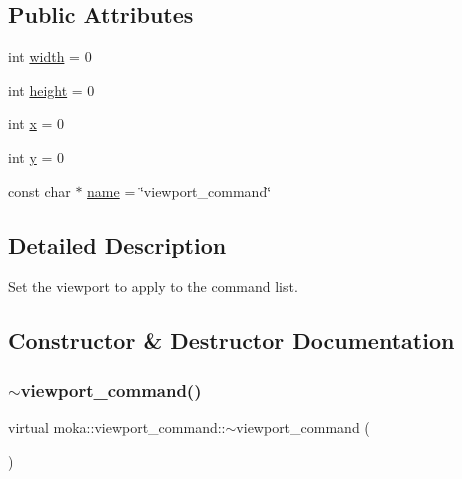 \subsection*{Public Attributes}
\begin{DoxyCompactItemize}
\item 
int \mbox{\hyperlink{classmoka_1_1viewport__command_a784e567b923e2fccf12dddc4739bb931}{width}} = 0
\item 
int \mbox{\hyperlink{classmoka_1_1viewport__command_ab64f17e585f3dbab2e45959cde1c429e}{height}} = 0
\item 
int \mbox{\hyperlink{classmoka_1_1viewport__command_a969e11499ed8e5bf1a389ec4c6bd7a4f}{x}} = 0
\item 
int \mbox{\hyperlink{classmoka_1_1viewport__command_a7141660e90f1abb2f3ce40c9d42d91f2}{y}} = 0
\item 
const char $\ast$ \mbox{\hyperlink{classmoka_1_1viewport__command_a36c3611773b0da39c29d1682e3a22944}{name}} = \char`\"{}viewport\+\_\+command\char`\"{}
\end{DoxyCompactItemize}


\subsection{Detailed Description}
Set the viewport to apply to the command list. 

\subsection{Constructor \& Destructor Documentation}
\mbox{\label{classmoka_1_1viewport__command_aed04702ad92d74fbf111babf9d68076d}} 
\subsubsection{\texorpdfstring{$\sim$viewport\_command()}{~viewport\_command()}}
{\footnotesize\ttfamily virtual moka\+::viewport\+\_\+command\+::$\sim$viewport\+\_\+command (\begin{DoxyParamCaption}{ }\end{DoxyParamCaption})\hspace{0.3cm}{\ttfamily [virtual]}}



